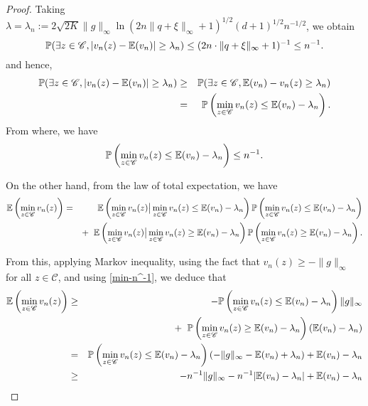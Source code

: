 \begin{proof}

	Taking $\lambda = \lambda_n := 2\sqrt{2K} \|g\|_{\infty} \ln (2n\|q + \xi\|_{\infty} + 1)^{1/2}(d+1)^{1/2}n^{-1/2}$, we obtain 
	$$ 
		\mathbb{P}(\exists z \in \mathscr{C}, |v_n(z) - \mathbb{E}(v_n)| \geq \lambda_n)  \leq (2n \cdot \|q + \xi \|_{\infty} + 1)^{-1} \leq n^{-1}.
	$$
	and hence,
	\begin{eqnarray*}
		\mathbb{P}(\exists z \in \mathscr{C}, |v_n(z) - \mathbb{E}(v_n)| \geq \lambda_n) & \geq & \mathbb{P}(\exists z \in \mathscr{C}, \mathbb{E}(v_n) - v_n(z) \geq \lambda_n) \\
		& = & \mathbb{P}\left(\min_{z\in \mathscr{C}}v_n(z) \leq \mathbb{E}(v_n) - \lambda_n\right). \\
	\end{eqnarray*}
	From where, we have 
	\begin{equation}\label{min-n^-1}
		\mathbb{P}\left(\min_{z\in \mathscr{C}}v_n(z) \leq \mathbb{E}(v_n) - \lambda_n\right) \leq n^{-1}. 
	\end{equation}

	On the other hand, from the law of total expectation, we have
	\begin{eqnarray*}
		\mathbb{E}\left(\min_{z\in \mathscr{C}}v_n(z)\right) & = & \mathbb{E}\left(\min_{z\in \mathscr{C}}v_n(z) \big| \min_{z\in \mathscr{C}}v_n(z) \leq \mathbb{E}(v_n) - \lambda_n\right)\mathbb{P}\left(\min_{z\in \mathscr{C}}v_n(z) \leq \mathbb{E}(v_n) - \lambda_n\right) \\
		& & + \;\; \mathbb{E}\left(\min_{z\in \mathscr{C}}v_n(z) \big| \min_{z\in \mathscr{C}}v_n(z) \geq \mathbb{E}(v_n) - \lambda_n\right)\mathbb{P}\left(\min_{z\in \mathscr{C}}v_n(z) \geq \mathbb{E}(v_n) - \lambda_n\right).
	\end{eqnarray*}

	From this, applying Markov inequality, using the fact that $v_n(z) \geq -\|g\|_{\infty}$ for all $z \in \mathscr{C}$, and using \eqref{min-n^-1}, we deduce that
	\begin{eqnarray*}
		\mathbb{E}\left(\min_{z\in \mathscr{C}}v_n(z)\right) & \geq & -\mathbb{P}\left(\min_{z\in \mathscr{C}}v_n(z) \leq \mathbb{E}(v_n) - \lambda_n\right)\|g\|_{\infty} \\
		& & + \;\; \mathbb{P}\left(\min_{z\in \mathscr{C}}v_n(z) \geq \mathbb{E}(v_n) - \lambda_n\right)(\mathbb{E}(v_n) - \lambda_n)\\  
		& = & \mathbb{P}\left(\min_{z\in \mathscr{C}}v_n(z) \leq \mathbb{E}(v_n) - \lambda_n\right)\left(-\|g\|_{\infty} - \mathbb{E}(v_n) + \lambda_n\right) + \mathbb{E}(v_n) - \lambda_n\\ 
		& \geq & -n^{-1}\|g\|_{\infty} - n^{-1}|\mathbb{E}(v_n) - \lambda_n| + \mathbb{E}(v_n) - \lambda_n
	\end{eqnarray*}


\end{proof}
